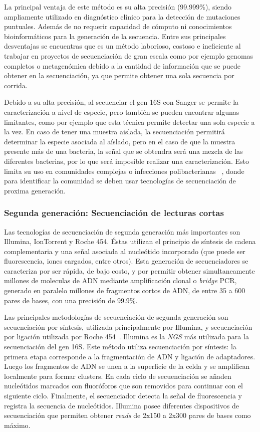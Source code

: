 La principal ventaja de este método es su alta precisión (99.999\%), siendo ampliamente utilizado en diagnóstico clínico para la detección de mutaciones puntuales. Además de no requerir capacidad de cómputo ni conocimientos bioinformáticos para la generación de la secuencia.  
Entre sus principales desventajas se encuentras que es un método laborioso, costoso e ineficiente al trabajar en proyectos de secuenciación de gran escala como por ejemplo genomas completos o metagenómica debido a la cantidad de información que se puede obtener en la secuenciación, ya que permite obtener una sola secuencia por corrida.
 
Debido a su alta precisión, al secuenciar el gen 16S con Sanger se permite la caracterización a nivel de especie, pero también se pueden encontrar algunas limitantes, como por ejemplo que esta técnica permite detectar una sola especie a la vez. En caso de tener una muestra aislada, la secuenciación permitirá determinar la especie asociada al aíslado, pero en el caso de que la muestra presente más de una bacteria, la señal que se obtendra será una mezcla de las diferentes bacterias, por lo que será imposible realizar una caracterización. Esto limita su uso en comunidades complejas o infecciones polibacterianas ~\cite{lamoureux2022prospective}, donde para identificar la comunidad se deben usar tecnologías de secuenciación de proxima generación.
\subsubsection{Segunda generación: Secuenciación de lecturas cortas}
Las tecnologías de secuenciación de segunda generación más importantes son Illumina, IonTorrent y Roche 454. Éstas utilizan el principio de síntesis de cadena complementaria y una señal asociada al nucleótido incorporado (que puede ser fluorescencia, iones cargados, entre otros). %
Esta generación de secuenciadores se caracteriza por ser rápida, de bajo costo, y por permitir obtener simultaneamente millones de moleculas de ADN mediante amplificación clonal o \textit{bridge} PCR, generado en paralelo millones de fragmentos cortos de ADN, de entre 35 a 600 pares de bases, con una precisión de 99.9\%.%


Las principales metodologías de secuenciación de segunda generación son secuenciación por síntesis, utilizada principalmente por Illumina, y secuenciación por ligación utilizada por Roche 454~\cite{mardis2008next}.
Illumina es la \textit{NGS} más utilizada para la secuenciación del gen 16S. Este método utiliza secuenciación por síntesis: la primera etapa corresponde a la fragmentación de ADN y ligación de adaptadores.
Luego los fragmentos de ADN se unen a la superficie de la celda y se amplifican localmente para formar clusters. 
En cada ciclo de secuenciación se añaden nucleótidos marcados con fluoróforos que son removidos para continuar con el siguiente ciclo.
Finalmente, el secuenciador detecta la señal de fluorescencia y registra la secuencia de nucleótidos. 
Illumina posee diferentes dispositivos de secuenciación que permiten obtener \textit{reads} de 2x150 a 2x300 pares de bases como máximo.

